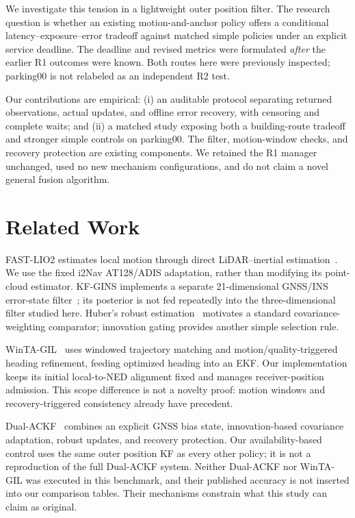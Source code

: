 \documentclass[conference]{IEEEtran}
\begin{document}
We investigate this tension in a lightweight outer position filter. The research question is whether an existing motion-and-anchor policy offers a conditional latency--exposure--error tradeoff against matched simple policies under an explicit service deadline. The deadline and revised metrics were formulated \emph{after} the earlier R1 outcomes were known. Both routes here were previously inspected; parking00 is not relabeled as an independent R2 test.

Our contributions are empirical: (i) an auditable protocol separating returned observations, actual updates, and offline error recovery, with censoring and complete waits; and (ii) a matched study exposing both a building-route tradeoff and stronger simple controls on parking00. The filter, motion-window checks, and recovery protection are existing components. We retained the R1 manager unchanged, used no new mechanism configurations, and do not claim a novel general fusion algorithm.

\section{Related Work}
FAST-LIO2 estimates local motion through direct LiDAR--inertial estimation~\cite{fastlio2}. We use the fixed i2Nav AT128/ADIS adaptation, rather than modifying its point-cloud estimator. KF-GINS implements a separate 21-dimensional GNSS/INS error-state filter~\cite{kfgins}; its posterior is not fed repeatedly into the three-dimensional filter studied here. Huber's robust estimation~\cite{huber} motivates a standard covariance-weighting comparator; innovation gating provides another simple selection rule.

WinTA-GIL~\cite{winta} uses windowed trajectory matching and motion/quality-triggered heading refinement, feeding optimized heading into an EKF. Our implementation keeps its initial local-to-NED alignment fixed and manages receiver-position admission. This scope difference is not a novelty proof: motion windows and recovery-triggered consistency already have precedent.

Dual-ACKF~\cite{dual} combines an explicit GNSS bias state, innovation-based covariance adaptation, robust updates, and recovery protection. Our availability-based control uses the same outer position KF as every other policy; it is not a reproduction of the full Dual-ACKF system. Neither Dual-ACKF nor WinTA-GIL was executed in this benchmark, and their published accuracy is not inserted into our comparison tables. Their mechanisms constrain what this study can claim as original.
\end{document}
